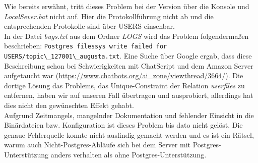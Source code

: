 Wie bereits erwähnt, tritt dieses Problem bei der Version über die Konsole und \textit{LocalSever.bat} nicht auf. Hier die Protokollführung nicht ab und die entsprechenden Protokolle sind über USERS einsehbar.\\
In der Datei \textit{bugs.txt} aus dem Ordner \textit{LOGS} wird das Problem folgendermaßen beschrieben: \lstinline{Postgres filessys write failed for USERS/topic\_127001\_augusta.txt}. Eine Suche über Google ergab, dass diese Beschreibung schon bei Schwierigkeiten mit ChatScript und dem Amazon Server aufgetaucht war (\url{https://www.chatbots.org/ai_zone/viewthread/3664/}). Die dortige Lösung das Problems, das Unique-Constraint der Relation \textit{userfiles} zu entfernen, haben wir auf unseren Fall übertragen und ausprobiert, allerdings hat dies nicht den gewünschten Effekt gehabt.\\
Aufgrund Zeitmangels, mangelnder Dokumentation und fehlender Einsicht in die Binärdateien bzw. Konfiguration ist dieses Problem bis dato nicht gelöst. Die genaue Fehlerquelle konnte nicht ausfindig gemacht werden und es ist ein Rätsel, warum auch Nicht-Postgres-Abläufe sich bei dem Server mit Postgres-Unterstützung anders verhalten als ohne Postgres-Unterstützung.
